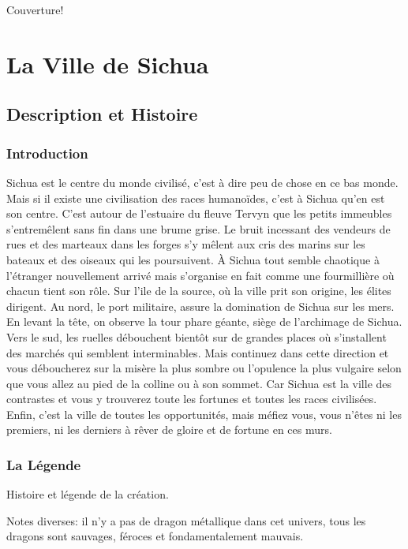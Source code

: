\documentclass{dd}
\begin{document}
Couverture!

\clearpage

\tableofcontents

\part{La Ville de Sichua}

\chapter{Description et Histoire}

\section{Introduction}

Sichua est le centre du monde civilisé, c'est à dire peu de chose en ce bas monde.
Mais si il existe une civilisation des races humanoïdes, c'est à Sichua qu'en est 
son centre. C'est autour de l'estuaire du fleuve Tervyn que les petits immeubles 
s'entremêlent sans fin dans une brume grise. Le bruit
incessant des vendeurs de rues et des marteaux dans les forges s'y mêlent aux cris
des marins sur les bateaux et des oiseaux qui les poursuivent. À Sichua 
tout semble chaotique à l'étranger nouvellement arrivé mais
s'organise en fait comme une fourmillière où chacun tient son rôle. Sur l'ile de 
la source, où la ville prit son origine, les élites dirigent. Au nord, le port 
militaire, assure la domination de Sichua sur les mers. En levant la tête, on 
observe la tour phare géante, siège de l'archimage de Sichua. Vers le sud, les 
ruelles débouchent bientôt sur de grandes places où s'installent des marchés qui
semblent interminables. Mais continuez dans cette direction et vous déboucherez
sur la misère la plus sombre ou l'opulence la plus vulgaire selon que vous allez 
au pied de la colline ou à son sommet. Car Sichua est la ville des contrastes
et vous y trouverez toute les fortunes et toutes les races civilisées. Enfin,
c'est la ville de toutes les opportunités, mais méfiez vous, vous n'êtes ni les 
premiers, ni les derniers à rêver de gloire et de fortune en ces murs.

\section{La Légende}

Histoire et légende de la création.

Notes diverses: il n'y a pas de dragon métallique dans cet univers, tous les 
dragons sont sauvages, féroces et fondamentalement mauvais.
\end{document}
